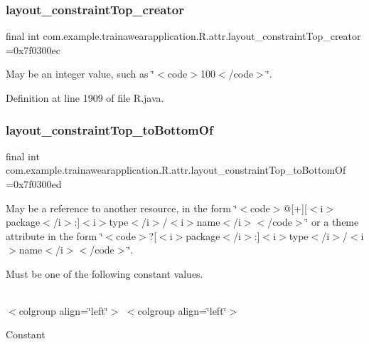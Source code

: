 \subsubsection{\texorpdfstring{layout\_constraintTop\_creator}{layout\_constraintTop\_creator}}
{\footnotesize\ttfamily final int com.\+example.\+trainawearapplication.\+R.\+attr.\+layout\+\_\+constraint\+Top\+\_\+creator =0x7f0300ec\hspace{0.3cm}{\ttfamily [static]}}

May be an integer value, such as \char`\"{}$<$code$>$100$<$/code$>$\char`\"{}. 

Definition at line 1909 of file R.\+java.

\mbox{\label{classcom_1_1example_1_1trainawearapplication_1_1_r_1_1attr_af53030c6c83202887597bbb31ef2ee77}} 
\subsubsection{\texorpdfstring{layout\_constraintTop\_toBottomOf}{layout\_constraintTop\_toBottomOf}}
{\footnotesize\ttfamily final int com.\+example.\+trainawearapplication.\+R.\+attr.\+layout\+\_\+constraint\+Top\+\_\+to\+Bottom\+Of =0x7f0300ed\hspace{0.3cm}{\ttfamily [static]}}

May be a reference to another resource, in the form \char`\"{}$<$code$>$@\mbox{[}+\mbox{]}\mbox{[}$<$i$>$package$<$/i$>$\+:\mbox{]}$<$i$>$type$<$/i$>$/$<$i$>$name$<$/i$>$$<$/code$>$\char`\"{} or a theme attribute in the form \char`\"{}$<$code$>$?\mbox{[}$<$i$>$package$<$/i$>$\+:\mbox{]}$<$i$>$type$<$/i$>$/$<$i$>$name$<$/i$>$$<$/code$>$\char`\"{}. 

Must be one of the following constant values.

\tabulinesep=1mm
\begin{longtabu}spread 0pt [c]{*{0}{|X[-1]}|}
\hline
\end{longtabu}
$<$colgroup align=\char`\"{}left\char`\"{}$>$ $<$colgroup align=\char`\"{}left\char`\"{}$>$ 

Constant

